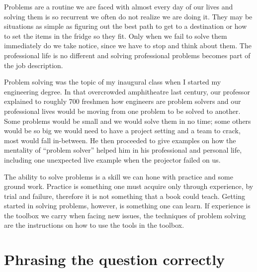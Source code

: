 

\noindent{}Problems are a routine we are faced with almost every day of our lives and
solving them is so recurrent we often do not realize we are doing it. They may
be situations as simple as figuring out the best path to get to a destination or
how to set the items in the fridge so they fit. Only when we fail to solve them
immediately do we take notice, since we have to stop and think about them. The
professional life is no different and solving professional problems becomes part
of the job description.

Problem solving was the topic of my inaugural class when I started my
engineering degree. In that overcrowded amphitheatre last century, our professor
explained to roughly 700 freshmen how engineers are problem solvers and our
professional lives would be moving from one problem to be solved to another.
Some problems would be small and we would solve them in no time; some others
would be so big we would need to have a project setting and a team to crack,
most would fall in-between. He then proceeded to give examples on how the
mentality of ``problem solver'' helped him in his professional and personal
life, including one unexpected live example when the projector failed on us.

The ability to solve problems is a skill we can hone with practice and some
ground work. Practice is something one must acquire only through experience, by
trial and failure, therefore it is not something that a book could teach.
Getting started in solving problems, however, is something one can learn. If
experience is the toolbox we carry when facing new issues, the techniques of
problem solving are the instructions on how to use the tools in the toolbox.

\section*{Phrasing the question correctly}

